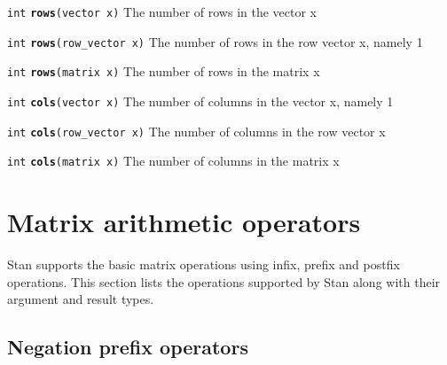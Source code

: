 \documentclass[
  10pt,
]{book}
\begin{document}

\texttt{int} \textbf{\texttt{rows}}\texttt{(vector\ x)}\newline
The number of rows in the vector x


\texttt{int} \textbf{\texttt{rows}}\texttt{(row\_vector\ x)}\newline
The number of rows in the row vector x, namely 1


\texttt{int} \textbf{\texttt{rows}}\texttt{(matrix\ x)}\newline
The number of rows in the matrix x


\texttt{int} \textbf{\texttt{cols}}\texttt{(vector\ x)}\newline
The number of columns in the vector x, namely 1


\texttt{int} \textbf{\texttt{cols}}\texttt{(row\_vector\ x)}\newline
The number of columns in the row vector x


\texttt{int} \textbf{\texttt{cols}}\texttt{(matrix\ x)}\newline
The number of columns in the matrix x

\hypertarget{matrix-arithmetic-operators}{%
\section{Matrix arithmetic operators}\label{matrix-arithmetic-operators}}

Stan supports the basic matrix operations using infix, prefix and
postfix operations. This section lists the operations supported by
Stan along with their argument and result types.

\hypertarget{negation-prefix-operators}{%
\subsection{Negation prefix operators}\label{negation-prefix-operators}}
\end{document}
